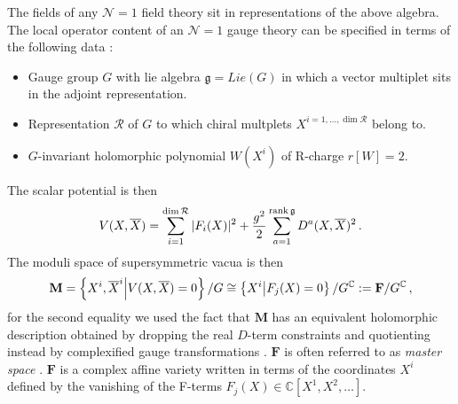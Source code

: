 \documentclass[main.tex]{subfiles}
\begin{document}
The fields of any $\mathcal{N}=1$ field theory sit in representations of the above algebra.  The local operator content of an $\mathcal{N}=1$ gauge theory can be specified in terms of the following data \cite{Wess:1974tw,Salam:1974yz,Salam:1974jj}:
\begin{itemize}
\item Gauge group $G$ with lie algebra $\mathfrak{g}=Lie(G)$ in which a vector multiplet sits in the adjoint representation. 
\item Representation $\mathcal{R}$ of $G$ to which chiral multplets $X^{i=1,\dots,\dim \mathcal{R}}$ belong to. 
\item $G$-invariant holomorphic polynomial $W(X^i)$ of R-charge $r[W]=2$.
\end{itemize}
The scalar potential is then
\begin{equation}
V(X,\overline{X})=\sum_{i=1}^{\dim \mathcal{R}}|F_i(X)|^2+\frac{g^2}{2}\sum_{a=1}^{\operatorname{rank} \mathfrak{g}}D^a(X,\overline{X})^2\,.
\end{equation}
The moduli space of supersymmetric vacua is then
\begin{equation}\label{eqn:intromodspacea}
\mathbf{M}=\left\{X^i,\overline{X}^i\middle| V(X,\overline{X})=0\right\}/G
\cong\left\{X^i\middle| F_j(X)=0\right\}/G^{\mathbb{C}}:=\mathbf{F}/G^{\mathbb{C}}\,,
\end{equation}
for the second equality we used the fact that $\mathbf{M}$ has an equivalent holomorphic description obtained by dropping the real $D$-term constraints and quotienting instead by complexified gauge transformations \cite{Intriligator:1995au,mumford1994geometric,Luty:1995sd}.  $\mathbf{F}$ is often referred to as \textit{master space} \cite{Forcella:2008eh,Forcella:2008ng,Forcella:2008bb,Feng:2007ur,Benvenuti:2006qr}.  $\mathbf{F}$ is a complex affine variety written in terms of the coordinates $X^i$ defined by the vanishing of the F-terms $F_j(X)\in \mathbb{C}[X^1,X^2,\dots]$.
\end{document}

